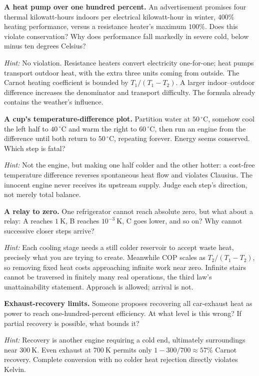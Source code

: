 \begin{puzzles}
\item \textbf{A heat pump over one hundred percent.} An advertisement promises four thermal kilowatt-hours indoors per electrical kilowatt-hour in winter, \(400\%\) heating performance, versus a resistance heater's maximum \(100\%\). Does this violate conservation? Why does performance fall markedly in severe cold, below minus ten degrees Celsius?

  \textit{Hint:} No violation. Resistance heaters convert electricity one-for-one; heat pumps transport outdoor heat, with the extra three units coming from outside. The Carnot heating coefficient is bounded by \(T_1/(T_1-T_2)\). A larger indoor--outdoor difference increases the denominator and transport difficulty. The formula already contains the weather's influence.

\item \textbf{A cup's temperature-difference plot.} Partition water at \(50\,^\circ\mathrm{C}\), somehow cool the left half to \(40\,^\circ\mathrm{C}\) and warm the right to \(60\,^\circ\mathrm{C}\), then run an engine from the difference until both return to \(50\,^\circ\mathrm{C}\), repeating forever. Energy seems conserved. Which step is fatal?

  \textit{Hint:} Not the engine, but making one half colder and the other hotter: a cost-free temperature difference reverses spontaneous heat flow and violates Clausius. The innocent engine never receives its upstream supply. Judge each step's direction, not merely total balance.

\item \textbf{A relay to zero.} One refrigerator cannot reach absolute zero, but what about a relay: A reaches \(1\ \mathrm{K}\), B reaches \(10^{-3}\ \mathrm{K}\), C goes lower, and so on? Why cannot successive closer steps arrive?

  \textit{Hint:} Each cooling stage needs a still colder reservoir to accept waste heat, precisely what you are trying to create. Meanwhile COP scales as \(T_2/(T_1-T_2)\), so removing fixed heat costs approaching infinite work near zero. Infinite stairs cannot be traversed in finitely many real operations, the third law's unattainability statement. Approach is allowed; arrival is not.

\item \textbf{Exhaust-recovery limits.} Someone proposes recovering all car-exhaust heat as power to reach one-hundred-percent efficiency. At what level is this wrong? If partial recovery is possible, what bounds it?

  \textit{Hint:} Recovery is another engine requiring a cold end, ultimately surroundings near \(300\ \mathrm{K}\). Even exhaust at \(700\ \mathrm{K}\) permits only \(1-300/700\approx 57\%\) Carnot recovery. Complete conversion with no colder heat rejection directly violates Kelvin.
\end{puzzles}

